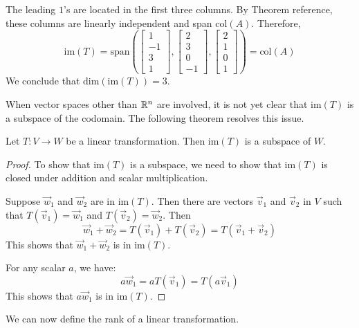 \documentclass{ximera}
\begin{document}
\begin{example}
\begin{explanation}
The leading $1$'s are located in the first three columns.  By Theorem {\color{red} reference}, these columns are linearly independent and span $\text{col}(A)$.  Therefore,
$$\text{im}(T)=\text{span}\left(\begin{bmatrix}1\\-1\\3\\1\end{bmatrix}, \begin{bmatrix}2\\3\\0\\-1\end{bmatrix}, \begin{bmatrix}2\\1\\0\\1\end{bmatrix}\right)=\text{col}(A)$$
We conclude that $\text{dim}(\text{im}(T))=3$.

\end{explanation}
\end{example}

When vector spaces other than $\mathbb{R}^n$ are involved, it is not yet clear that $\text{im}(T)$ is a subspace of the codomain. The following theorem resolves this issue.

\begin{theorem}\label{th:imagesubspace}
Let $T:V\rightarrow W$ be a linear transformation.  Then $\text{im}(T)$ is a subspace of $W$.
\end{theorem}
\begin{proof}
To show that $\text{im}(T)$ is a subspace, we need to show that $\text{im}(T)$ is closed under addition and scalar multiplication.

Suppose $\vec{w}_1$ and $\vec{w}_2$ are in $\text{im}(T)$.  Then there are vectors $\vec{v}_1$ and $\vec{v}_2$ in $V$ such that $T(\vec{v}_1)=\vec{w}_1$ and $T(\vec{v}_2)=\vec{w}_2$.  Then
$$\vec{w}_1+\vec{w}_2=T(\vec{v}_1)+T(\vec{v}_2)=T(\vec{v}_1+\vec{v}_2)$$
This shows that $\vec{w}_1+\vec{w}_2$ is in $\text{im}(T)$.

For any scalar $a$, we have:
$$a\vec{w}_1=aT(\vec{v}_1)=T(a\vec{v}_1)$$
This shows that $a\vec{w}_1$ is in $\text{im}(T)$.
\end{proof}

We can now define the rank of a linear transformation.
\end{document}
